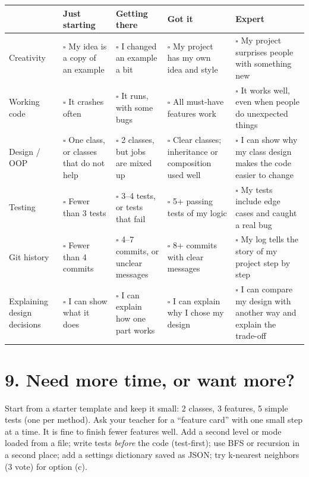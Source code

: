 \documentclass[level=3]{kidscode}
\begin{document}
\begingroup\small
\renewcommand{\arraystretch}{1.3}
\begin{longtable}{@{}>{\bfseries\raggedright\arraybackslash}p{2.2cm}>{\raggedright\arraybackslash}p{3.15cm}>{\raggedright\arraybackslash}p{3.15cm}>{\raggedright\arraybackslash}p{3.15cm}>{\raggedright\arraybackslash}p{\dimexpr\linewidth-11.65cm-8\tabcolsep}@{}}
\toprule
\rowcolor{kcaccent!15} & Just starting & Getting there & Got it & Expert\\ \midrule\endhead
\bottomrule\endfoot
Creativity & $\square$ My idea is a copy of an example & $\square$ I changed an example a bit & $\square$ My project has my own idea and style & $\square$ My project surprises people with something new\\ \midrule
Working code & $\square$ It crashes often & $\square$ It runs, with some bugs & $\square$ All must-have features work & $\square$ It works well, even when people do unexpected things\\ \midrule
Design / OOP & $\square$ One class, or classes that do not help & $\square$ 2 classes, but jobs are mixed up & $\square$ Clear classes; inheritance or composition used well & $\square$ I can show why my class design makes the code easier to change\\ \midrule
Testing & $\square$ Fewer than 3 tests & $\square$ 3--4 tests, or tests that fail & $\square$ 5+ passing tests of my logic & $\square$ My tests include edge cases and caught a real bug\\ \midrule
Git history & $\square$ Fewer than 4 commits & $\square$ 4--7 commits, or unclear messages & $\square$ 8+ commits with clear messages & $\square$ My log tells the story of my project step by step\\ \midrule
Explaining design decisions & $\square$ I can show what it does & $\square$ I can explain how one part works & $\square$ I can explain why I chose my design & $\square$ I can compare my design with another way and explain the trade-off\\
\end{longtable}
\endgroup

\section{9. Need more time, or want more?}
\begin{differentiation}
\supportpath Start from a starter template and keep it small: 2 classes, 3 features, 5 simple tests
(one per method). Ask your teacher for a \enquote{feature card} with one small step at a time. It
is fine to finish fewer features well.
\extensionpath Add a second level or mode loaded from a file; write tests \emph{before} the code
(test-first); use BFS or recursion in a second place; add a settings dictionary saved as JSON; try
k-nearest neighbors (3 vote) for option (c).
\end{differentiation}
\end{document}
